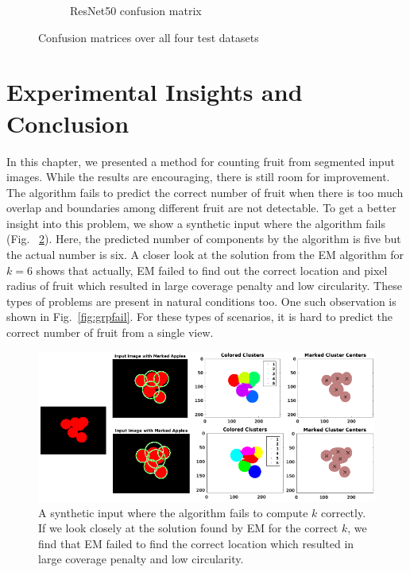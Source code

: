 \begin{figure}[!htbp]
\begin{subfigure}[b]{0.46\textwidth}
    \caption{ResNet50 confusion matrix}
    \end{subfigure}
    \caption[Comparison of counting performance with H{\"a}ni et al.~\cite{hani_jfr_counting}]{Confusion matrices over all four test datasets}
    \label{fig:confmat}
\end{figure}



\section{Experimental Insights and Conclusion}\label{sec:conc}
In this chapter, we presented a method for counting fruit from segmented input images. While the results are encouraging, there is still room for improvement. The algorithm fails to predict the correct number of fruit when there is too much overlap and boundaries among different fruit are not detectable. To get a better insight into this problem, we show a synthetic input where the algorithm fails (Fig. ~\ref{fig:wrong}). Here, the predicted number of components by the algorithm is five but the actual number is six. A closer look at the solution from the EM algorithm for $k = 6$ shows that actually, EM failed to find out the correct location and pixel radius of fruit which resulted in large coverage penalty and low circularity. These types of problems are present in natural conditions too. One such observation is shown in  Fig.~\ref{fig:grpfail}. For these types of scenarios, it is hard to predict the correct number of fruit from a single view. 

\begin{figure}[!htbp]

        \centering        
            \includegraphics[width = .8\textwidth]{figures/counting/wrong.png}           
        
   \caption[A failure case for the unsupervised clustering based counting on synthetic data.]{A synthetic input where the algorithm fails to compute $k$ correctly. If we look closely at the solution found by EM for the correct $k$, we find that EM failed to find the correct location which resulted in large coverage penalty and low circularity. }
   \label{fig:wrong}   
\end{figure}    

